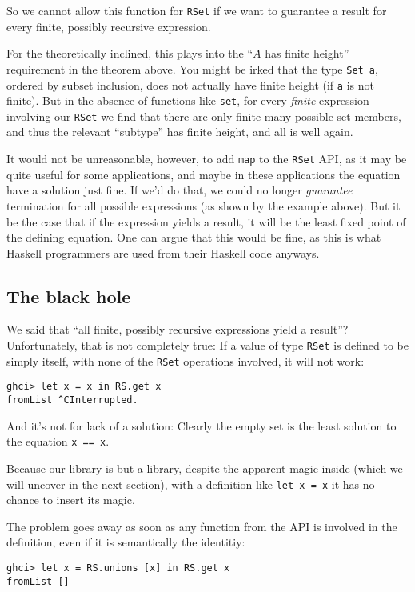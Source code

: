 \documentclass[manuscript,screen,acmsmall]{acmart}
\begin{document}
So we cannot allow this function for \verb|RSet| if we want to guarantee a result for every finite, possibly recursive expression.

For the theoretically inclined, this plays into the “$A$ has finite height” requirement in the theorem above. You might be irked that the type \verb|Set a|, ordered by subset inclusion, does not actually have finite height (if \verb|a| is not finite). But in the absence of functions like \verb|set|, for every \emph{finite} expression involving our \verb|RSet| we find that there are only finite many possible set members, and thus the relevant “subtype” has finite height, and all is well again.

It would not be unreasonable, however, to add \verb|map| to the \verb|RSet| API, as it may be quite useful for some applications, and maybe in these applications the equation have a solution just fine. If we'd do that, we could no longer \emph{guarantee} termination for all possible expressions (as shown by the example above). But it be the case that if the expression yields a result, it will be the least fixed point of the defining equation. One can argue that this would be fine, as this is what Haskell programmers are used from their Haskell code anyways.

\subsection{The black hole}

We said that “all finite, possibly recursive expressions yield a result”? Unfortunately, that is not completely true: If a value of type \verb|RSet| is defined to be simply itself, with none of the \verb|RSet| operations involved, it will not work:
\begin{verbatim}
ghci> let x = x in RS.get x
fromList ^CInterrupted.
\end{verbatim}
And it’s not for lack of a solution: Clearly the empty set is the least solution to the equation \verb|x == x|.

Because our library is but a library, despite the apparent magic inside (which we will uncover in the next section), with a definition like \verb|let x = x| it has no chance to insert its magic.

The problem goes away as soon as any function from the API is involved in the definition, even if it is semantically the identitiy:
\begin{verbatim}
ghci> let x = RS.unions [x] in RS.get x
fromList []
\end{verbatim}
\end{document}
